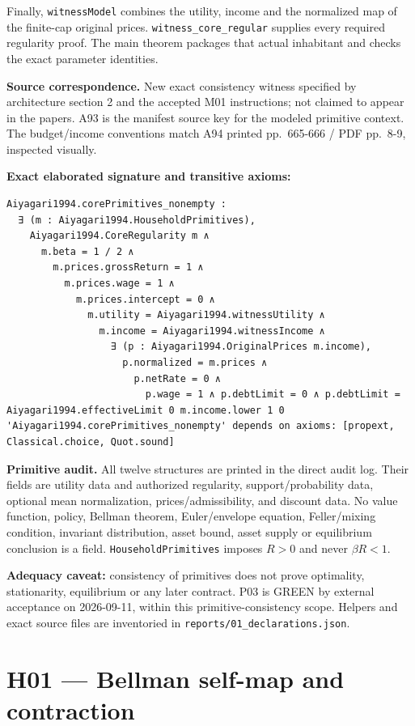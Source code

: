 \documentclass[
  11pt,
]{article}
\let\LedgerOriginalTexttt\texttt
\renewcommand{\texttt}[1]{{\small\LedgerOriginalTexttt{#1}}}
\begin{document}
Finally, \texttt{witnessModel} combines the utility, income and the
normalized map of the finite-cap original prices.
\texttt{witness\_core\_regular} supplies every required regularity
proof. The main theorem packages that actual inhabitant and checks the
exact parameter identities.

\textbf{Source correspondence.} New exact consistency witness specified
by architecture section 2 and the accepted M01 instructions; not claimed
to appear in the papers. A93 is the manifest source key for the modeled
primitive context. The budget/income conventions match A94 printed
pp.~665-666 / PDF pp.~8-9, inspected visually.

\textbf{Exact elaborated signature and transitive axioms:}

\begin{verbatim}
Aiyagari1994.corePrimitives_nonempty :
  ∃ (m : Aiyagari1994.HouseholdPrimitives),
    Aiyagari1994.CoreRegularity m ∧
      m.beta = 1 / 2 ∧
        m.prices.grossReturn = 1 ∧
          m.prices.wage = 1 ∧
            m.prices.intercept = 0 ∧
              m.utility = Aiyagari1994.witnessUtility ∧
                m.income = Aiyagari1994.witnessIncome ∧
                  ∃ (p : Aiyagari1994.OriginalPrices m.income),
                    p.normalized = m.prices ∧
                      p.netRate = 0 ∧
                        p.wage = 1 ∧ p.debtLimit = 0 ∧ p.debtLimit = Aiyagari1994.effectiveLimit 0 m.income.lower 1 0
'Aiyagari1994.corePrimitives_nonempty' depends on axioms: [propext, Classical.choice, Quot.sound]
\end{verbatim}

\textbf{Primitive audit.} All twelve structures are printed in the
direct audit log. Their fields are utility data and authorized
regularity, support/probability data, optional mean normalization,
prices/admissibility, and discount data. No value function, policy,
Bellman theorem, Euler/envelope equation, Feller/mixing condition,
invariant distribution, asset bound, asset supply or equilibrium
conclusion is a field. \texttt{HouseholdPrimitives} imposes \(R>0\) and
never \(\beta R<1\).

\textbf{Adequacy caveat:} consistency of primitives does not prove
optimality, stationarity, equilibrium or any later contract. P03 is
GREEN by external acceptance on 2026-09-11, within this
primitive-consistency scope. Helpers and exact source files are
inventoried in \texttt{reports/01\_declarations.json}.

\section{H01 --- Bellman self-map and
contraction}\label{h01-bellman-self-map-and-contraction}
\end{document}
